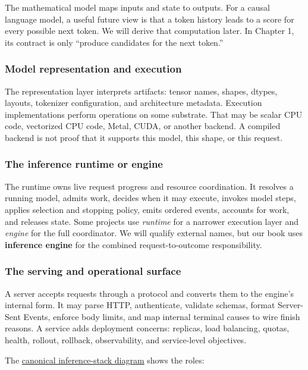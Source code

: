 \documentclass[
  10pt,
]{article}
\begin{document}
The mathematical model maps inputs and state to outputs. For a causal
language model, a useful future view is that a token history leads to a
score for every possible next token. We will derive that computation
later. In Chapter 1, its contract is only ``produce candidates for the
next token.''

\subsubsection{Model representation and
execution}\label{model-representation-and-execution}

The representation layer interprets artifacts: tensor names, shapes,
dtypes, layouts, tokenizer configuration, and architecture metadata.
Execution implementations perform operations on some substrate. That may
be scalar CPU code, vectorized CPU code, Metal, CUDA, or another
backend. A compiled backend is not proof that it supports this model,
this shape, or this request.

\subsubsection{The inference runtime or
engine}\label{the-inference-runtime-or-engine}

The runtime owns live request progress and resource coordination. It
resolves a running model, admits work, decides when it may execute,
invokes model steps, applies selection and stopping policy, emits
ordered events, accounts for work, and releases state. Some projects use
\emph{runtime} for a narrower execution layer and \emph{engine} for the
full coordinator. We will qualify external names, but our book uses
\textbf{inference engine} for the combined request-to-outcome
responsibility.

\subsubsection{The serving and operational
surface}\label{the-serving-and-operational-surface}

A server accepts requests through a protocol and converts them to the
engine's internal form. It may parse HTTP, authenticate, validate
schemas, format Server-Sent Events, enforce body limits, and map
internal terminal causes to wire finish reasons. A service adds
deployment concerns: replicas, load balancing, quotas, health, rollout,
rollback, observability, and service-level objectives.

The
\href{https://github.com/hermonai/inside-the-llm-engine/blob/astra-visual-rewrite/diagrams/runtime/inference-stack.txt}{canonical
inference-stack diagram} shows the roles:
\end{document}
